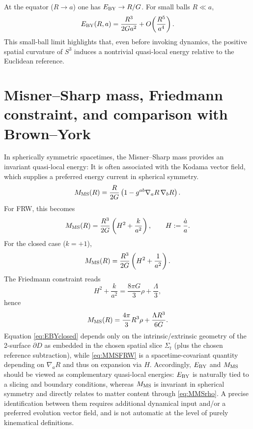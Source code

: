 \documentclass[
  reprint,
  amsmath,amssymb,
  aps,
  prd,
  superscriptaddress,
  nofootinbib,
  longbibliography
]{revtex4-2}
\begin{document}
At the equator ($R\to a$) one has $E_{\rm BY}\to R/G$.
For small balls $R\ll a$,
\begin{equation}
E_{\rm BY}(R,a)=\frac{R^3}{2Ga^2}+O\!\left(\frac{R^5}{a^4}\right).
\end{equation}
This small-ball limit highlights that, even before invoking dynamics, the positive spatial curvature of $S^3$ induces a nontrivial quasi-local energy relative to the Euclidean reference.
\section{Misner--Sharp mass, Friedmann constraint, and comparison with Brown--York}
In spherically symmetric spacetimes, the Misner--Sharp mass provides an invariant quasi-local energy:
It is often associated with the Kodama vector field, which supplies a preferred energy current in spherical symmetry.
\begin{equation}
M_{\rm MS}(R)=\frac{R}{2G}\left(1-g^{ab}\nabla_aR\,\nabla_bR\right).
\end{equation}
For FRW, this becomes
\begin{equation}
M_{\rm MS}(R)=\frac{R^3}{2G}\left(H^2+\frac{k}{a^2}\right),
\qquad H:=\frac{\dot a}{a}.
\label{eq:MMSFRW}
\end{equation}
For the closed case ($k=+1$),
\begin{equation}
M_{\rm MS}(R)=\frac{R^3}{2G}\left(H^2+\frac{1}{a^2}\right).
\end{equation}
The Friedmann constraint reads
\begin{equation}
H^2+\frac{k}{a^2}=\frac{8\pi G}{3}\rho+\frac{\Lambda}{3},
\end{equation}
hence
\begin{equation}
M_{\rm MS}(R)=\frac{4\pi}{3}R^3\rho+\frac{\Lambda R^3}{6G}.
\label{eq:MMSrho}
\end{equation}
Equation \eqref{eq:EBYclosed} depends only on the intrinsic/extrinsic geometry of the 2-surface $\partial D$ as embedded in the chosen spatial slice $\Sigma_t$ (plus the chosen reference subtraction), while \eqref{eq:MMSFRW} is a spacetime-covariant quantity depending on $\nabla_a R$ and thus on expansion via $H$.
Accordingly, $E_{\rm BY}$ and $M_{\rm MS}$ should be viewed as complementary quasi-local energies: $E_{\rm BY}$ is naturally tied to a slicing and boundary conditions, whereas $M_{\rm MS}$ is invariant in spherical symmetry and directly relates to matter content through \eqref{eq:MMSrho}.
A precise identification between them requires additional dynamical input and/or a preferred evolution vector field, and is not automatic at the level of purely kinematical definitions.
\end{document}
